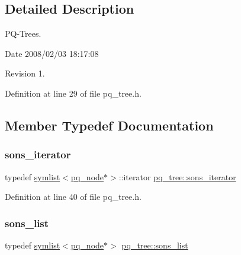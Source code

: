 \subsection{Detailed Description}
P\+Q-\/\+Trees. 

\begin{DoxyParagraph}{Date}
2008/02/03 18\+:17\+:08 
\end{DoxyParagraph}
\begin{DoxyParagraph}{Revision}
1. 
\end{DoxyParagraph}


Definition at line 29 of file pq\+\_\+tree.\+h.



\subsection{Member Typedef Documentation}
\mbox{\label{classpq__tree_ab47263066d4b0acc70e00043870d748a}} 
\subsubsection{\texorpdfstring{sons\+\_\+iterator}{sons\_iterator}}
{\footnotesize\ttfamily typedef \mbox{\hyperlink{classsymlist}{symlist}}$<$\mbox{\hyperlink{classpq__node}{pq\+\_\+node}}$\ast$$>$\+::iterator \mbox{\hyperlink{classpq__tree_ab47263066d4b0acc70e00043870d748a}{pq\+\_\+tree\+::sons\+\_\+iterator}}}



Definition at line 40 of file pq\+\_\+tree.\+h.

\mbox{\label{classpq__tree_a241e516724fdb5ca21239772164458f3}} 
\subsubsection{\texorpdfstring{sons\+\_\+list}{sons\_list}}
{\footnotesize\ttfamily typedef \mbox{\hyperlink{classsymlist}{symlist}}$<$\mbox{\hyperlink{classpq__node}{pq\+\_\+node}}$\ast$$>$ \mbox{\hyperlink{classpq__tree_a241e516724fdb5ca21239772164458f3}{pq\+\_\+tree\+::sons\+\_\+list}}}



